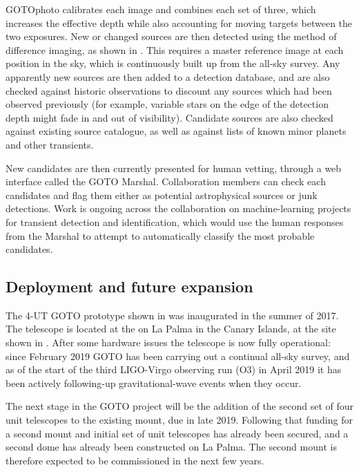 \begin{colsection}
\begin{colsection}
GOTOphoto calibrates each image and combines each set of three, which increases the effective depth while also accounting for moving targets between the two exposures. New or changed sources are then detected using the method of difference imaging, as shown in . This requires a master reference image at each position in the sky, which is continuously built up from the all-sky survey. Any apparently new sources are then added to a detection database, and are also checked against historic observations to discount any sources which had been observed previously (for example, variable stars on the edge of the detection depth might fade in and out of visibility). Candidate sources are also checked against existing source catalogue, as well as against lists of known minor planets and other transients.

New candidates are then currently presented for human vetting, through a web interface called the GOTO Marshal. Collaboration members can check each candidates and flag them either as potential astrophysical sources or junk detections. Work is ongoing across the collaboration on machine-learning projects for transient detection and identification, which would use the human responses from the Marshal to attempt to automatically classify the most probable candidates.

\end{colsection}


\subsection{Deployment and future expansion}
\label{sec:goto_expansion}
\begin{colsection}

The 4-UT GOTO prototype shown in  was inaugurated in the summer of 2017. The telescope is located at the  on La Palma in the Canary Islands, at the site shown in . After some hardware issues the telescope is now fully operational: since February 2019 GOTO has been carrying out a continual all-sky survey, and as of the start of the third LIGO-Virgo observing run (O3) in April 2019 it has been actively following-up gravitational-wave events when they occur.

The next stage in the GOTO project will be the addition of the second set of four unit telescopes to the existing mount, due in late 2019. Following that funding for a second mount and initial set of unit telescopes has already been secured, and a second dome has already been constructed on La Palma. The second mount is therefore expected to be commissioned in the next few years.


\end{colsection}
\end{colsection}
